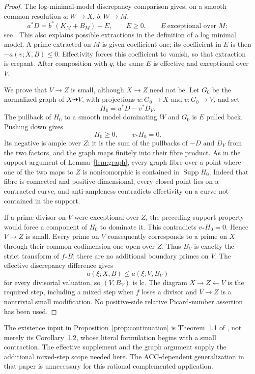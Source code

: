 \begin{proof}
The log-minimal-model discrepancy comparison gives, on a smooth
common resolution $a:W\to X$, $b:W\to M$,
\[
 a^*D=b^*(K_M+B_M)+E,
 \qquad E\ge0,
 \qquad E\ \text{exceptional over }M;
\]
see \cite[Remark~2.6]{BirkarLC}.  This also explains possible
extractions in the definition of a log minimal model.  A prime
extracted on $M$ is given coefficient one; its coefficient in
$E$ is then $-a(v;X,B)\le0$.  Effectivity forces this coefficient
to vanish, so that extraction is crepant.  After composition
with $q$, the same $E$ is effective and exceptional over $V$.

We prove that $V\to Z$ is small, although $X\to Z$ need not be.
Let $G_0$ be the normalized graph of $X\dashrightarrow V$, with
projections $u:G_0\to X$ and $v:G_0\to V$, and set
\[
 H_0=u^*D-v^*D_V.
\]
The pullback of $H_0$ to a smooth model dominating $W$ and $G_0$
is $E$ pulled back.  Pushing down gives
\[
 H_0\ge0,\qquad v_*H_0=0.
\]
Its negative is ample over $Z$: it is the sum of the pullbacks
of $-D$ and $D_V$ from the two factors, and the graph maps
finitely into their fibre product.  As in the support argument
of Lemma~\ref{lem:graph}, every graph fibre over a point where
one of the two maps to $Z$ is nonisomorphic is contained in
$\operatorname{Supp}H_0$.  Indeed that fibre is connected and
positive-dimensional, every closed point lies on a contracted
curve, and anti-ampleness contradicts effectivity on a curve
not contained in the support.

If a prime divisor on $V$ were exceptional over $Z$, the preceding
support property would force a component of $H_0$ to dominate
it.  This contradicts $v_*H_0=0$.  Hence $V\to Z$ is small.
Every prime on $V$ consequently corresponds to a prime on $X$
through their common codimension-one open over $Z$.  Thus
$B_V$ is exactly the strict transform of $f_*B$; there are no
additional boundary primes on $V$.  The effective discrepancy
difference gives
\[
 a(\xi;X,B)\le a(\xi;V,B_V)
\]
for every divisorial valuation, so $(V,B_V)$ is lc.  The diagram
$X\to Z\leftarrow V$ is the required step, including a mixed
step when $f$ loses a divisor and $V\to Z$ is a nontrivial small
modification.  No positive-side relative Picard-number assertion
has been used.
\end{proof}

\begin{remark}
The existence input in Proposition~\ref{prop:continuation} is
Theorem~1.1 of \cite{BirkarLC}, not merely its Corollary~1.2,
whose literal formulation begins with a small contraction.
The effective supplement and the graph argument supply the
additional mixed-step scope needed here.  The ACC-dependent
generalization in that paper is unnecessary for this rational
complemented application.
\end{remark}
